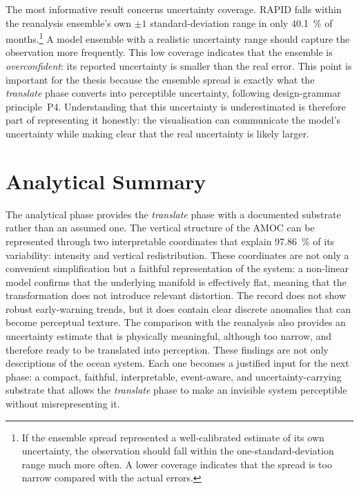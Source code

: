%

The most informative result concerns uncertainty coverage. RAPID falls within the reanalysis ensemble's own $\pm1$ standard-deviation range in only \SI{40.1}{\percent} of months.\footnote{If the ensemble spread represented a well-calibrated estimate of its own uncertainty, the observation should fall within the one-standard-deviation range much more often. A lower coverage indicates that the spread is too narrow compared with the actual errors.} A model ensemble with a realistic uncertainty range should capture the observation more frequently. This low coverage indicates that the ensemble is \emph{overconfident}: its reported uncertainty is smaller than the real error. This point is important for the thesis because the ensemble spread is exactly what the \emph{translate} phase converts into perceptible uncertainty, following design-grammar principle~P4. Understanding that this uncertainty is underestimated is therefore part of representing it honestly: the visualisation can communicate the model's uncertainty while making clear that the real uncertainty is likely larger.

\section{Analytical Summary}
\label{sec:detect-summary}

The analytical phase provides the \emph{translate} phase with a documented substrate rather than an assumed one. The vertical structure of the AMOC can be represented through two interpretable coordinates that explain \SI{97.86}{\percent} of its variability: intensity and vertical redistribution. These coordinates are not only a convenient simplification but a faithful representation of the system: a non-linear model confirms that the underlying manifold is effectively flat, meaning that the transformation does not introduce relevant distortion. The record does not show robust early-warning trends, but it does contain clear discrete anomalies that can become perceptual texture. The comparison with the reanalysis also provides an uncertainty estimate that is physically meaningful, although too narrow, and therefore ready to be translated into perception. These findings are not only descriptions of the ocean system. Each one becomes a justified input for the next phase: a compact, faithful, interpretable, event-aware, and uncertainty-carrying substrate that allows the \emph{translate} phase to make an invisible system perceptible without misrepresenting it.